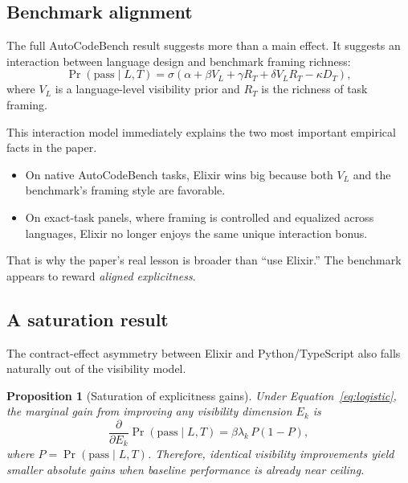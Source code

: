 \documentclass[11pt]{article}
\newtheorem{proposition}{Proposition}
\newcommand{\acb}{AutoCodeBench}
\newcommand{\elixir}{Elixir}
\newcommand{\pythonlang}{Python}
\newcommand{\tslang}{TypeScript}
\begin{document}
\subsection{Benchmark alignment}

The full \acb{} result suggests more than a main effect. It suggests an interaction between language design and benchmark framing richness:
\begin{equation}
\Pr(\mathrm{pass} \mid L,T) =
\sigma\!\left(
\alpha + \beta V_L + \gamma R_T + \delta V_L R_T - \kappa D_T
\right),
\label{eq:interaction}
\end{equation}
where $V_L$ is a language-level visibility prior and $R_T$ is the richness of task framing.

This interaction model immediately explains the two most important empirical facts in the paper.

\begin{itemize}
  \item On native \acb{} tasks, \elixir{} wins big because both $V_L$ and the benchmark's framing style are favorable.
  \item On exact-task panels, where framing is controlled and equalized across languages, \elixir{} no longer enjoys the same unique interaction bonus.
\end{itemize}

That is why the paper's real lesson is broader than ``use \elixir{}.'' The benchmark appears to reward \emph{aligned explicitness}.

\subsection{A saturation result}

The contract-effect asymmetry between \elixir{} and \pythonlang{}/\tslang{} also falls naturally out of the visibility model.

\begin{proposition}[Saturation of explicitness gains]
Under Equation~\eqref{eq:logistic}, the marginal gain from improving any visibility dimension $E_k$ is
\begin{equation}
\frac{\partial}{\partial E_k} \Pr(\mathrm{pass} \mid L,T)
=
\beta \lambda_k \, P(1-P),
\label{eq:derivative}
\end{equation}
where $P = \Pr(\mathrm{pass} \mid L,T)$. Therefore, identical visibility improvements yield smaller absolute gains when baseline performance is already near ceiling.
\end{proposition}
\end{document}
